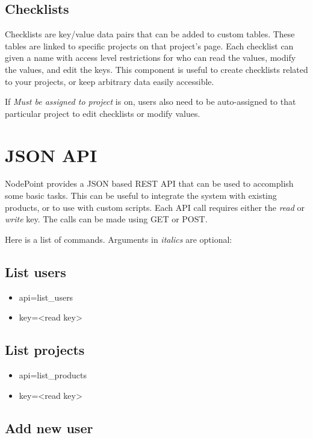 \documentclass[11pt]{article}
\begin{document}
\subsection{Checklists}
Checklists are key/value data pairs that can be added to custom tables. These tables are linked to specific projects on that project's page. Each checklist can given a name with access level restrictions for who can read the values, modify the values, and edit the keys. This component is useful to create checklists related to your projects, or keep arbitrary data easily accessible.

If \textit{Must be assigned to project} is on, users also need to be auto-assigned to that particular project to edit checklists or modify values.

\clearpage
\section{JSON API}
NodePoint provides a JSON based REST API that can be used to accomplish some basic tasks. This can be useful to integrate the system with existing products, or to use with custom scripts. Each API call requires either the \textit{read} or \textit{write} key. The calls can be made using GET or POST.

Here is a list of commands. Arguments in \textit{italics} are optional:

\subsection{List users}

\begin{itemize}
\item api=list\_users
\item key=<read key>
\end{itemize}

\subsection{List projects}

\begin{itemize}
\item api=list\_products
\item key=<read key>
\end{itemize}

\subsection{Add new user}
\end{document}

